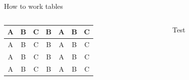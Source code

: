 \documentclass[aspectratio=169,xcolor=table]{beamer}
\begin{document}
			\begin{frame}{How to work tables}
				\begin{columns}
					\begin{column}{5cm}
\begin{tabular}{|c|c|c|c|c|c|c|}
	\hline
	\cellcolor{universitycolor}A&\cellcolor{grayy}B&\cellcolor{universitycolor}C&\cellcolor{grayy}B&\cellcolor{universitycolor}A&\cellcolor{grayy}B&\cellcolor{universitycolor}C\\
	\hline
	\hline
	\cellcolor{universitycolor}A&\cellcolor{grayy}B&\cellcolor{universitycolor}C&\cellcolor{grayy}B&\cellcolor{universitycolor}A&\cellcolor{grayy}B&\cellcolor{universitycolor}C\\
	\hline
	\hline
	\cellcolor{universitycolor}A&\cellcolor{grayy}B&\cellcolor{universitycolor}C&\cellcolor{grayy}B&\cellcolor{universitycolor}A&\cellcolor{grayy}B&\cellcolor{universitycolor}C\\
	\hline
	\hline
	\cellcolor{universitycolor}A&\cellcolor{grayy}B&\cellcolor{universitycolor}C&\cellcolor{grayy}B&\cellcolor{universitycolor}A&\cellcolor{grayy}B&\cellcolor{universitycolor}C\\
	\hline
\end{tabular}
					\end{column}
					\begin{column}{5cm}
					Test 
					\end{column}
					
			\end{columns}

			\end{frame}
			
\end{document}
